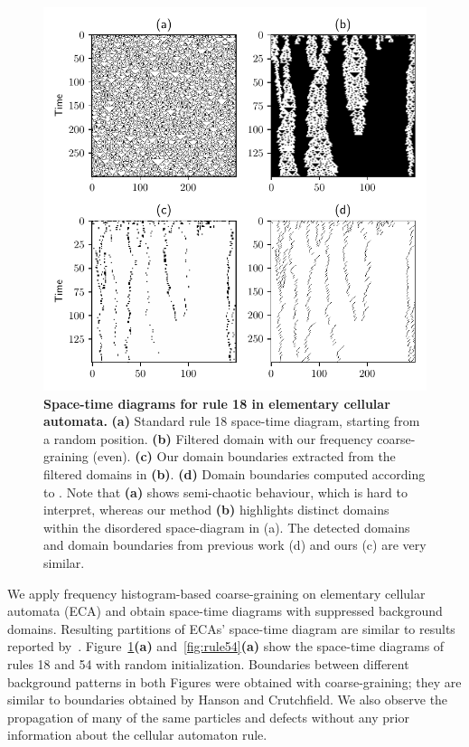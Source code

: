 \begin{figure}[th]
  \centering
  \includegraphics[width=\linewidth]{figures/rule18.pdf}
  \caption{\label{fig:rule18} \textbf{Space-time diagrams for rule 18 in
      elementary cellular automata.} \textbf{(a)} Standard rule 18 space-time
    diagram, starting from a random position. \textbf{(b)} Filtered domain with
    our frequency coarse-graining (even). \textbf{(c)} Our domain boundaries
    extracted from the filtered domains in \textbf{(b)}. \textbf{(d)} Domain
    boundaries computed according to
    \parencite{hansonAttractorbasinPortraitCellular1992}. Note that \textbf{(a)}
    shows semi-chaotic behaviour, which is hard to interpret, whereas our method
    \textbf{(b)} highlights distinct domains within the disordered space-diagram
    in (a). The detected domains and domain boundaries from previous work (d)
    and ours (c) are very similar.}
\end{figure}

We apply frequency histogram-based coarse-graining on elementary cellular
automata (ECA) and obtain space-time diagrams with suppressed background
domains. Resulting partitions of ECAs' space-time diagram are similar to results
reported by~\parencite{hansonAttractorbasinPortraitCellular1992,
  hansonComputationalMechanicsCellular1997}. Figure~\ref{fig:rule18}\textbf{(a)}
and~\ref{fig:rule54}\textbf{(a)} show the space-time diagrams of rules 18 and 54
with random initialization. Boundaries between different background patterns in
both Figures were obtained with coarse-graining; they are similar to boundaries
obtained by Hanson and Crutchfield. We also observe the propagation of many of
the same particles and defects without any prior information about the cellular
automaton rule.

